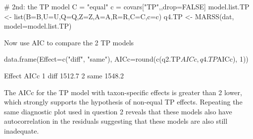 \begin{Schunk}
\begin{Sinput}
 # 2nd: the TP model
 C = "equal"
 c = covars["TP",,drop=FALSE]
 model.list.TP <- list(B=B,U=U,Q=Q,Z=Z,A=A,R=R,C=C,c=c)
 q4.TP <- MARSS(dat, model=model.list.TP)
\end{Sinput}
\end{Schunk}
Now use AIC to compare the 2 TP models
\begin{Schunk}
\begin{Sinput}
 data.frame(Effect=c("diff", "same"),
 		   AICc=round(c(q2.TP$AICc, q4.TP$AICc), 1))
\end{Sinput}
\begin{Soutput}
  Effect   AICc
1   diff 1512.7
2   same 1548.2
\end{Soutput}
\end{Schunk}

The AICc for the TP model with taxon-specific effects is greater than 2
lower, which 
strongly supports the hypothesis of non-equal TP effects. Repeating the same diagnostic plot used in question 2 reveals that these models also have autocorrelation in the residuals suggesting that these models are also still inadequate.

